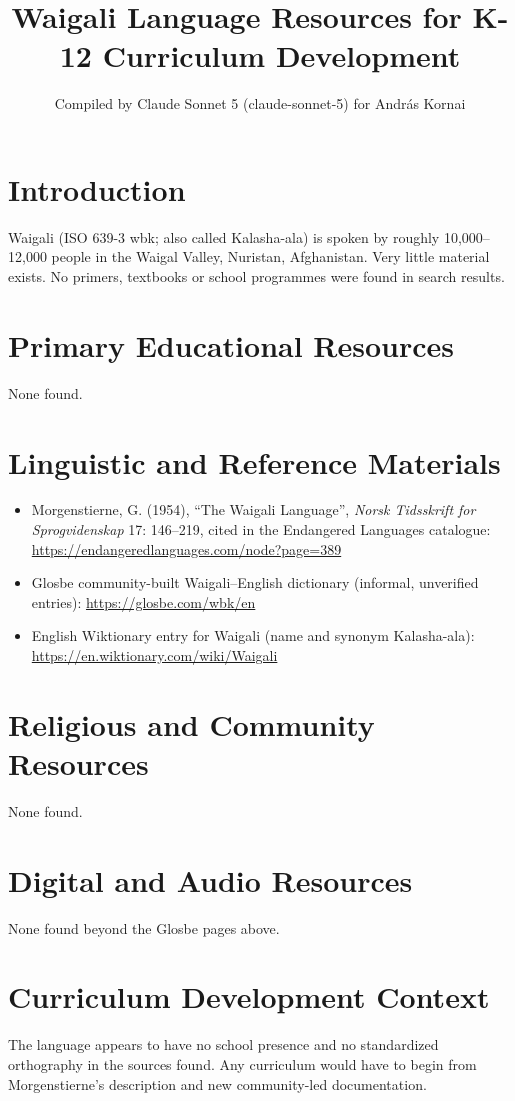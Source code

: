 \documentclass[12pt]{article}
\title{Waigali Language Resources for K-12 Curriculum Development}
\author{Compiled by Claude Sonnet 5 (claude-sonnet-5) for Andr\'as Kornai}
\date{}
\begin{document}
\maketitle
\section{Introduction}
Waigali (ISO 639-3 wbk; also called Kalasha-ala) is spoken by roughly 10,000--12,000 people in the Waigal Valley, Nuristan, Afghanistan. Very little material exists. No primers, textbooks or school programmes were found in search results.
\section{Primary Educational Resources}
None found.
\section{Linguistic and Reference Materials}
\begin{itemize}
\item Morgenstierne, G. (1954), ``The Waigali Language'', \emph{Norsk Tidsskrift for Sprogvidenskap} 17: 146--219, cited in the Endangered Languages catalogue: \url{https://endangeredlanguages.com/node?page=389}
\item Glosbe community-built Waigali--English dictionary (informal, unverified entries): \url{https://glosbe.com/wbk/en}
\item English Wiktionary entry for Waigali (name and synonym Kalasha-ala): \url{https://en.wiktionary.com/wiki/Waigali}
\end{itemize}
\section{Religious and Community Resources}
None found.
\section{Digital and Audio Resources}
None found beyond the Glosbe pages above.
\section{Curriculum Development Context}
The language appears to have no school presence and no standardized orthography in the sources found. Any curriculum would have to begin from Morgenstierne's description and new community-led documentation.
\end{document}
